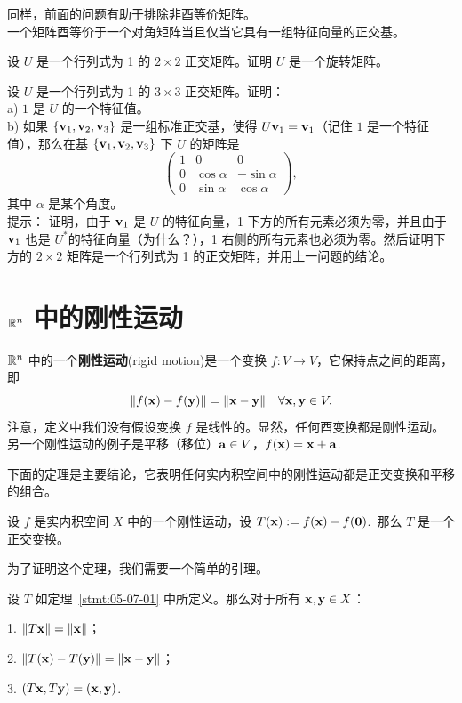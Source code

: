 \begin{problemset}
同样，前面的问题有助于排除非酉等价矩阵。
\\
一个矩阵酉等价于一个对角矩阵当且仅当它具有一组特征向量的正交基。
\item \label{ex:05-06-08} 设 $U$ 是一个行列式为 1 的 $2 \times 2$ 正交矩阵。证明 $U$ 是一个旋转矩阵。
\item \label{ex:05-06-09} 设 $U$ 是一个行列式为 1 的 $3 \times 3$ 正交矩阵。证明：
\\
a) $1$ 是 $U$ 的一个特征值。
\\
b) 如果 $\{\mathbf{v}_1, \mathbf{v}_2, \mathbf{v}_3\}$ 是一组标准正交基，使得 $U\mathbf{v}_1 = \mathbf{v}_1$（记住 $1$ 是一个特征值），那么在基 $\{\mathbf{v}_1, \mathbf{v}_2, \mathbf{v}_3\}$ 下 $U$ 的矩阵是 $$\begin{pmatrix} 1 & 0 & 0 \\ 0 & \cos \alpha & -\sin \alpha \\ 0 & \sin \alpha & \cos \alpha \end{pmatrix},$$
其中 $\alpha$ 是某个角度。
\\
{\heiti 提示：} 证明，由于 $\mathbf{v}_1$ 是 $U$ 的特征向量，1 下方的所有元素必须为零，并且由于 $\mathbf{v}_1$ 也是 $U^*$的特征向量（为什么？），1 右侧的所有元素也必须为零。然后证明下方的 $2 \times 2$ 矩阵是一个行列式为 1 的正交矩阵，并用上一问题的结论。

\end{problemset}

\section{\texorpdfstring{$\mathbb{R}^n$ 中的刚性运动}{R^n 中的刚性运动}}\label{sec:05-07}

$\mathbb{R}^n$ 中的一个\textbf{刚性运动}(rigid motion)是一个变换 $f: V \to V$，它保持点之间的距离，即
$$\|f(\mathbf{x}) - f(\mathbf{y})\| = \|\mathbf{x} - \mathbf{y}\| \quad \forall \mathbf{x}, \mathbf{y} \in V.$$
注意，定义中我们没有假设变换 $f$ 是线性的。显然，任何酉变换都是刚性运动。另一个刚性运动的例子是平移（移位）$\mathbf{a} \in V$，$f(\mathbf{x}) = \mathbf{x} + \mathbf{a}$.

下面的定理是主要结论，它表明任何实内积空间中的刚性运动都是正交变换和平移的组合。

\begin{theorem}\label{stmt:05-07-01} 设 $f$ 是实内积空间 $X$ 中的一个刚性运动，设 $T(\mathbf{x}) := f(\mathbf{x}) - f(\mathbf{0})$.~那么 $T$ 是一个正交变换。\end{theorem}

为了证明这个定理，我们需要一个简单的引理。

\begin{lemma}\label{stmt:05-07-02} 设 $T$ 如定理~\ref{stmt:05-07-01} 中所定义。那么对于所有 $\mathbf{x}, \mathbf{y} \in X$：

1. $\|T\mathbf{x}\| = \|\mathbf{x}\|$；

2. $\|T(\mathbf{x}) - T(\mathbf{y})\| = \|\mathbf{x} - \mathbf{y}\|$；

3. $(T\mathbf{x}, T\mathbf{y}) = (\mathbf{x}, \mathbf{y})$.~\end{lemma}

